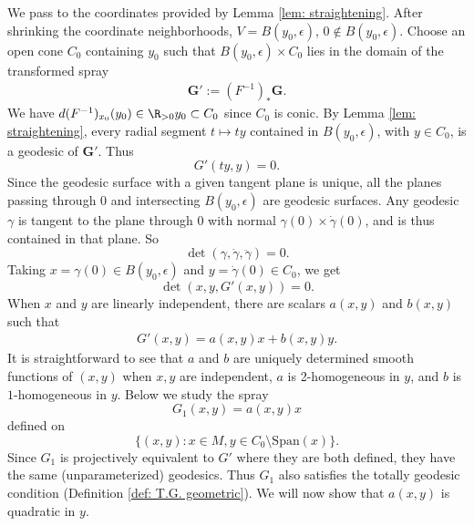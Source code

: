 \documentclass{article}
\numberwithin{equation}{section}
\theoremstyle{plain}
\begin{document}
    We pass to the coordinates provided by Lemma \ref{lem: straightening}. After shrinking the coordinate neighborhoods, $V = B(y_0,\epsilon)$, $0 \notin B(y_0,\epsilon)$. Choose an open cone $C_0$ containing $y_0$ such that $B(y_0,\epsilon) \times C_0$ lies in the domain of the transformed spray 
    \begin{align}
        \mathbf{G}' :=(F^{-1})_*\mathbf{G}.
    \end{align}
    We have $d(F^{-1})_{x_0}(y_0) \in \R_{>0} y_0 \subset C_0$ since $C_0$ is conic. By  Lemma \ref{lem: straightening}, every radial segment $t \mapsto ty$ contained in $B(y_0,\epsilon)$, with $y \in C_0$, is a geodesic of $\mathbf{G}'$. Thus 
    \begin{equation}
    G'(ty,y) = 0.
    \end{equation}
     Since the geodesic surface with a given tangent plane is unique, all the planes passing through $0$ and intersecting $B(y_0, \epsilon)$ are geodesic surfaces. Any geodesic $\gamma$ is tangent to the plane through $0$ with normal $\gamma(0) \times \dot \gamma(0)$, and is thus contained in that plane. So 
     \begin{equation}
     \det (\gamma, \dot \gamma, \ddot \gamma) = 0.
     \end{equation}
      Taking $x = \gamma(0) \in B(y_0,\epsilon)$ and $y = \dot \gamma(0) \in C_0$, we get 
\begin{equation}
\det(x,y,G'(x,y)) = 0.
\end{equation}
    When $x$ and $y$ are linearly independent, there are scalars $a(x,y)$ and $b(x,y)$ such that 
    \begin{align}
        G'(x,y) = a(x,y)x + b(x,y)y. 
    \end{align}
    It is straightforward to see that $a$ and $b$ are uniquely determined smooth functions of $(x,y)$ when $x,y$ are independent, $a$ is 2-homogeneous in $y$, and $b$ is $1$-homogeneous in $y$. Below we study the spray 
    \begin{equation}
    G_1(x,y) = a(x,y)x
    \end{equation}
     defined on
\begin{equation}
\{(x,y) : x \in M, y \in C_0 \setminus \mathrm{Span}(x)\}.
\end{equation}
    Since $G_1$ is projectively equivalent to $G'$ where they are both defined, they have the same (unparameterized) geodesics. Thus $G_1$ also satisfies the totally geodesic condition (Definition \ref{def: T.G. geometric}). We will now show that $a(x,y)$ is quadratic in $y$.
    
\end{document}
